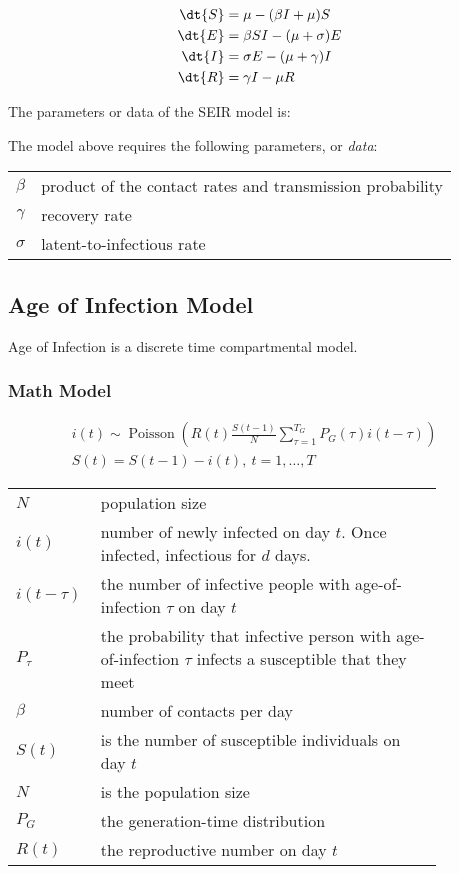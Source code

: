 \begin{align}
    \dt{S} & = \mu - (\beta I + \mu) S \\%
    \dt{E} & = \beta S I - (\mu + \sigma) E \\%
    \dt{I} & = \sigma E - (\mu + \gamma) I \\%
    \dt{R} & = \gamma I - \mu R %
\end{align}

The parameters or data of the SEIR model is:

The model above requires the following parameters,
or \textit{data}:

\begin{tabular}{cl}
    $\beta$ & product of the contact rates and transmission probability\\%
    $\gamma$ & recovery rate \\%
    $\sigma$ & latent-to-infectious rate
\end{tabular}

\subsection{Age of Infection Model}
\label{subsec:infectious-disease-models:aoi}

Age of Infection is a discrete time compartmental model.

\subsubsection{Math Model}

\begin{align}
    i(t) \sim \operatorname{Poisson} \left( R(t) \frac{S(t-1)}{N} \sum\limits_{\tau=1}^{T_G} {P_G(\tau)i(t-\tau)} \right) & \label{eq:aoi-i-poisson} \\
    S(t) = S(t - 1) - i(t), ~t=1,\ldots,T \label{eq:aoi-s-recurrence} &
\end{align}

\begin{tabular}{p{0.1\linewidth}p{0.75\linewidth}}
    $N$ & population size \\
    $i(t)$ &  number of newly infected on day $t$.
    Once infected, infectious for $d$ days. \\
    $i(t-\tau)$ & the number of infective people with age-of-infection $\tau$ on day $t$ \\
    $P_{\tau}$ & the probability that infective person with age-of-infection $\tau$ infects a susceptible that they meet \\
    $\beta$ & number of contacts per day \\
    $S(t)$ &  is the number of susceptible individuals on day $t$ \\
    $N$ & is the population size \\
    $P_G$ & the generation-time distribution \\
    $R(t)$ &  the reproductive number on day $t$ \\
\end{tabular}

